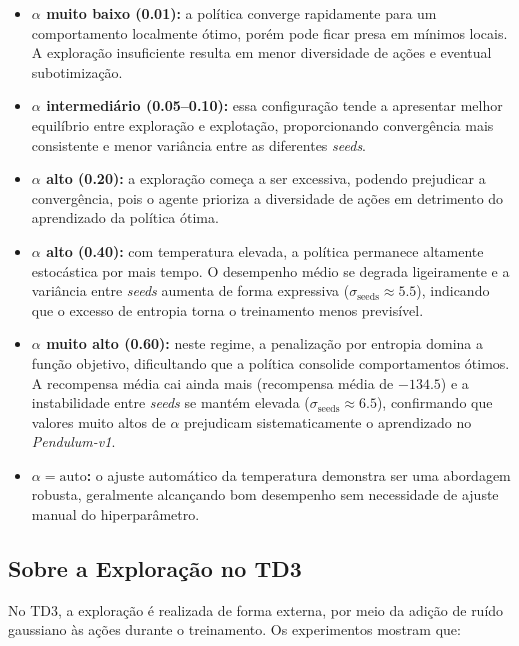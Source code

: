 \documentclass{Supervised_Reinforcement_Learningqsport}
\begin{document}
\begin{itemize}
    \item \textbf{$\alpha$ muito baixo (0.01):} a política converge rapidamente para um comportamento localmente ótimo, porém pode ficar presa em mínimos locais. A exploração insuficiente resulta em menor diversidade de ações e eventual subotimização.

    \item \textbf{$\alpha$ intermediário (0.05--0.10):} essa configuração tende a apresentar melhor equilíbrio entre exploração e explotação, proporcionando convergência mais consistente e menor variância entre as diferentes \textit{seeds}.

    \item \textbf{$\alpha$ alto (0.20):} a exploração começa a ser excessiva, podendo prejudicar a convergência, pois o agente prioriza a diversidade de ações em detrimento do aprendizado da política ótima.

    \item \textbf{$\alpha$ alto (0.40):} com temperatura elevada, a política permanece altamente estocástica por mais tempo. O desempenho médio se degrada ligeiramente e a variância entre \textit{seeds} aumenta de forma expressiva ($\sigma_{\text{seeds}} \approx 5.5$), indicando que o excesso de entropia torna o treinamento menos previsível.

    \item \textbf{$\alpha$ muito alto (0.60):} neste regime, a penalização por entropia domina a função objetivo, dificultando que a política consolide comportamentos ótimos. A recompensa média cai ainda mais (recompensa média de $-134.5$) e a instabilidade entre \textit{seeds} se mantém elevada ($\sigma_{\text{seeds}} \approx 6.5$), confirmando que valores muito altos de $\alpha$ prejudicam sistematicamente o aprendizado no \textit{Pendulum-v1}.

    \item \textbf{$\alpha=\mathrm{auto}$:} o ajuste automático da temperatura demonstra ser uma abordagem robusta, geralmente alcançando bom desempenho sem necessidade de ajuste manual do hiperparâmetro.
\end{itemize}

\subsection{Sobre a Exploração no TD3}

No TD3, a exploração é realizada de forma externa, por meio da adição de ruído gaussiano às ações durante o treinamento. Os experimentos mostram que:
\end{document}
